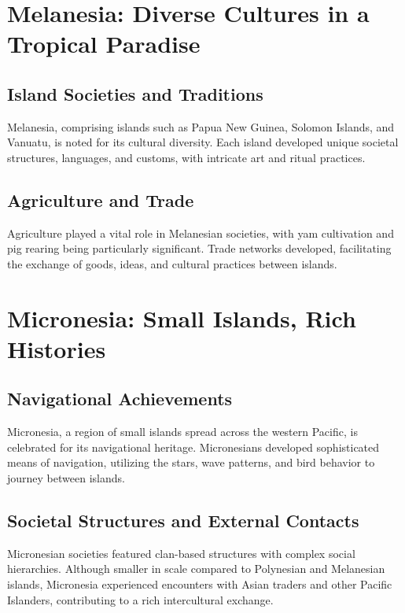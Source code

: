\documentclass[a4paper,12pt]{book}
\begin{document}
\section{Melanesia: Diverse Cultures in a Tropical Paradise}
\label{sec:melanesia}

\subsection{Island Societies and Traditions}
\label{subsec:melanesia-societies-traditions}

Melanesia, comprising islands such as Papua New Guinea, Solomon Islands, and Vanuatu, is noted for its cultural diversity. Each island developed unique societal structures, languages, and customs, with intricate art and ritual practices.

\subsection{Agriculture and Trade}
\label{subsec:melanesia-agriculture-trade}

Agriculture played a vital role in Melanesian societies, with yam cultivation and pig rearing being particularly significant. Trade networks developed, facilitating the exchange of goods, ideas, and cultural practices between islands.

\section{Micronesia: Small Islands, Rich Histories}
\label{sec:micronesia}

\subsection{Navigational Achievements}
\label{subsec:micronesia-navigation}

Micronesia, a region of small islands spread across the western Pacific, is celebrated for its navigational heritage. Micronesians developed sophisticated means of navigation, utilizing the stars, wave patterns, and bird behavior to journey between islands.

\subsection{Societal Structures and External Contacts}
\label{subsec:micronesia-society-contacts}

Micronesian societies featured clan-based structures with complex social hierarchies. Although smaller in scale compared to Polynesian and Melanesian islands, Micronesia experienced encounters with Asian traders and other Pacific Islanders, contributing to a rich intercultural exchange.
\end{document}
